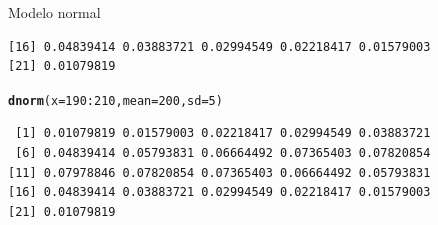 \documentclass[10pt]{beamer}\usepackage[]{graphicx}\usepackage[]{color}
\makeatletter
\newcommand{\hlnum}[1]{\textcolor[rgb]{0.686,0.059,0.569}{#1}}%
\newcommand{\hlopt}[1]{\textcolor[rgb]{0,0,0}{#1}}%
\newcommand{\hlstd}[1]{\textcolor[rgb]{0.345,0.345,0.345}{#1}}%
\newcommand{\hlkwc}[1]{\textcolor[rgb]{0.333,0.667,0.333}{#1}}%
\newcommand{\hlkwd}[1]{\textcolor[rgb]{0.737,0.353,0.396}{\textbf{#1}}}%
\newenvironment{kframe}{%
 \def\at@end@of@kframe{}%
 \ifinner\ifhmode%
  \def\at@end@of@kframe{\end{minipage}}%
  \begin{minipage}{\columnwidth}%
 \fi\fi%
 \def\FrameCommand##1{\hskip\@totalleftmargin \hskip-\fboxsep
 \colorbox{shadecolor}{##1}\hskip-\fboxsep
     \hskip-\linewidth \hskip-\@totalleftmargin \hskip\columnwidth}%
 \MakeFramed {\advance\hsize-\width
   \@totalleftmargin\z@ \linewidth\hsize
   \@setminipage}}%
 {\par\unskip\endMakeFramed%
 \at@end@of@kframe}
\newenvironment{knitrout}{}{} %
\theoremstyle{definition}
\makeatother
\begin{document}
\begin{frame}[fragile]{Modelo normal}
\begin{knitrout}
\begin{kframe}
\begin{verbatim}
[16] 0.04839414 0.03883721 0.02994549 0.02218417 0.01579003
[21] 0.01079819
\end{verbatim}
\begin{alltt}
\hlkwd{dnorm}\hlstd{(}\hlkwc{x} \hlstd{=} \hlnum{190}\hlopt{:}\hlnum{210}\hlstd{,} \hlkwc{mean} \hlstd{=} \hlnum{200}\hlstd{,} \hlkwc{sd} \hlstd{=} \hlnum{5}\hlstd{)}
\end{alltt}
\begin{verbatim}
 [1] 0.01079819 0.01579003 0.02218417 0.02994549 0.03883721
 [6] 0.04839414 0.05793831 0.06664492 0.07365403 0.07820854
[11] 0.07978846 0.07820854 0.07365403 0.06664492 0.05793831
[16] 0.04839414 0.03883721 0.02994549 0.02218417 0.01579003
[21] 0.01079819
\end{verbatim}
\end{kframe}
\end{knitrout}
\end{frame}
\end{document}
